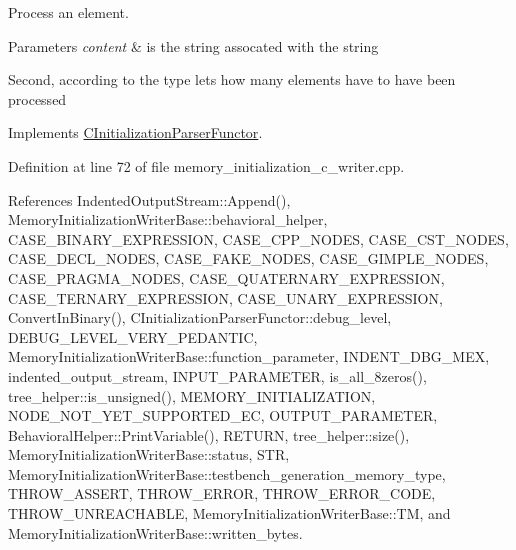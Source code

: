 Process an element. 


\begin{DoxyParams}{Parameters}
{\em content} & is the string assocated with the string \\
\hline
\end{DoxyParams}
Second, according to the type let\textquotesingle{}s how many elements have to have been processed 

Implements \hyperlink{classCInitializationParserFunctor_ac84560143f5dcbb961ba1a8f43fea9a1}{C\+Initialization\+Parser\+Functor}.



Definition at line 72 of file memory\+\_\+initialization\+\_\+c\+\_\+writer.\+cpp.



References Indented\+Output\+Stream\+::\+Append(), Memory\+Initialization\+Writer\+Base\+::behavioral\+\_\+helper, C\+A\+S\+E\+\_\+\+B\+I\+N\+A\+R\+Y\+\_\+\+E\+X\+P\+R\+E\+S\+S\+I\+ON, C\+A\+S\+E\+\_\+\+C\+P\+P\+\_\+\+N\+O\+D\+ES, C\+A\+S\+E\+\_\+\+C\+S\+T\+\_\+\+N\+O\+D\+ES, C\+A\+S\+E\+\_\+\+D\+E\+C\+L\+\_\+\+N\+O\+D\+ES, C\+A\+S\+E\+\_\+\+F\+A\+K\+E\+\_\+\+N\+O\+D\+ES, C\+A\+S\+E\+\_\+\+G\+I\+M\+P\+L\+E\+\_\+\+N\+O\+D\+ES, C\+A\+S\+E\+\_\+\+P\+R\+A\+G\+M\+A\+\_\+\+N\+O\+D\+ES, C\+A\+S\+E\+\_\+\+Q\+U\+A\+T\+E\+R\+N\+A\+R\+Y\+\_\+\+E\+X\+P\+R\+E\+S\+S\+I\+ON, C\+A\+S\+E\+\_\+\+T\+E\+R\+N\+A\+R\+Y\+\_\+\+E\+X\+P\+R\+E\+S\+S\+I\+ON, C\+A\+S\+E\+\_\+\+U\+N\+A\+R\+Y\+\_\+\+E\+X\+P\+R\+E\+S\+S\+I\+ON, Convert\+In\+Binary(), C\+Initialization\+Parser\+Functor\+::debug\+\_\+level, D\+E\+B\+U\+G\+\_\+\+L\+E\+V\+E\+L\+\_\+\+V\+E\+R\+Y\+\_\+\+P\+E\+D\+A\+N\+T\+IC, Memory\+Initialization\+Writer\+Base\+::function\+\_\+parameter, I\+N\+D\+E\+N\+T\+\_\+\+D\+B\+G\+\_\+\+M\+EX, indented\+\_\+output\+\_\+stream, I\+N\+P\+U\+T\+\_\+\+P\+A\+R\+A\+M\+E\+T\+ER, is\+\_\+all\+\_\+8zeros(), tree\+\_\+helper\+::is\+\_\+unsigned(), M\+E\+M\+O\+R\+Y\+\_\+\+I\+N\+I\+T\+I\+A\+L\+I\+Z\+A\+T\+I\+ON, N\+O\+D\+E\+\_\+\+N\+O\+T\+\_\+\+Y\+E\+T\+\_\+\+S\+U\+P\+P\+O\+R\+T\+E\+D\+\_\+\+EC, O\+U\+T\+P\+U\+T\+\_\+\+P\+A\+R\+A\+M\+E\+T\+ER, Behavioral\+Helper\+::\+Print\+Variable(), R\+E\+T\+U\+RN, tree\+\_\+helper\+::size(), Memory\+Initialization\+Writer\+Base\+::status, S\+TR, Memory\+Initialization\+Writer\+Base\+::testbench\+\_\+generation\+\_\+memory\+\_\+type, T\+H\+R\+O\+W\+\_\+\+A\+S\+S\+E\+RT, T\+H\+R\+O\+W\+\_\+\+E\+R\+R\+OR, T\+H\+R\+O\+W\+\_\+\+E\+R\+R\+O\+R\+\_\+\+C\+O\+DE, T\+H\+R\+O\+W\+\_\+\+U\+N\+R\+E\+A\+C\+H\+A\+B\+LE, Memory\+Initialization\+Writer\+Base\+::\+TM, and Memory\+Initialization\+Writer\+Base\+::written\+\_\+bytes.

